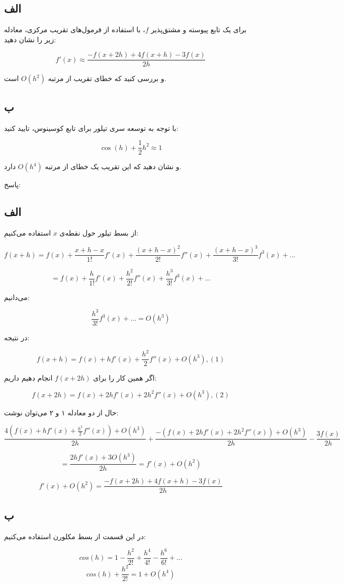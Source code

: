 \subsection*{الف}

برای یک تابع پیوسته و مشتق‌پذیر \( f \)، با استفاده از فرمول‌های تقریب مرکزی، معادله زیر را نشان دهید:

\[ f'(x) \approx \frac{-f(x + 2h) + 4f(x + h) - 3f(x)}{2h} \]

و بررسی کنید که خطای تقریب از مرتبه \( O(h^2) \) است.

\subsection*{ب}

با توجه به توسعه سری تیلور برای تابع کوسینوس، تایید کنید:

\[ \cos(h) + \frac{1}{2} h^2 \approx 1 \]

و نشان دهید که این تقریب یک خطای از مرتبه \( O(h^4) \) دارد.

\begin{comment}
\end{comment}
پاسخ:


    \subsection*{الف}
    از بسط تیلور حول نقطه‌ی $x$ استفاده می‌کنیم:
    
    $$f(x + h ) = f(x) + \frac{x + h - x}{1!}f'(x) + \frac{(x + h - x)^{2}}{2!}f''(x) + \frac{(x + h - x)^{3}}{3!}f^{3}(x) + ...$$
    
    $$= f(x) + \frac{h}{1!}f'(x) + \frac{h^{2}}{2!}f''(x) + \frac{h^{3}}{3!}f^{3}(x) + ... $$
    
    می‌دانیم: 
    
    $$\frac{h^{3}}{3!}f^{3}(x) + ... = O(h^{3})$$
    
    در نتیجه:
    
    $$f(x + h) = f(x) + hf'(x) + \frac{h^{2}}{2}f''(x) + O(h^{3}),  (1)$$
    
    اگر همین کار را برای $f(x + 2h)$ انجام دهیم داریم:
    
    
    $$f(x + 2h) = f(x) + 2hf'(x) + 2h^{2}f''(x) + O(h^{3}), (2)$$
    
    حال از دو معادله ۱ و ۲ می‌توان نوشت:
    
    $$\frac{4(f(x) + hf'(x) + \frac{h^{2}}{2}f''(x)) + O(h^{3})}{2h} + \frac{-(f(x) + 2hf'(x) + 2h^{2}f''(x)) + O(h^{3})}{2h} - \frac{3f(x)}{2h}$$
    
    
    $$= \frac{2hf'(x) + 3O(h^{3})}{2h} = f'(x) + O(h^{2})$$
    
    
    $$f'(x) + O(h^{2}) = \frac{-f(x + 2h) + 4f(x + h) - 3f(x)}{2h}$$
    
    
    \subsection*{ب}
    در این قسمت از بسط مکلورن استفاده می‌کنیم:
    
    $$cos(h) = 1 - \frac{h^{2}}{2!} + \frac{h^{4}}{4!} - \frac{h^{6}}{6!} + ...$$
    $$cos(h) + \frac{h^{2}}{2!} = 1 + O(h^{4})$$



